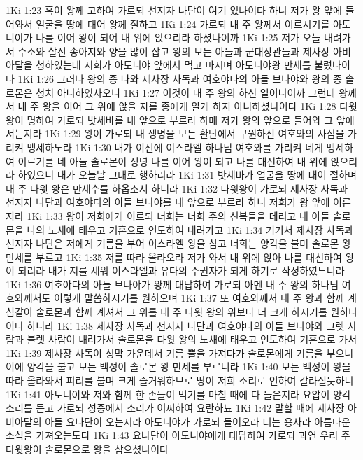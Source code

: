 1Ki 1:23  혹이 왕께 고하여 가로되 선지자 나단이 여기 있나이다 하니 저가 왕 앞에 들어와서 얼굴을 땅에 대어 왕께 절하고
1Ki 1:24  가로되 내 주 왕께서 이르시기를 아도니야가 나를 이어 왕이 되어 내 위에 앉으리라 하셨나이까
1Ki 1:25  저가 오늘 내려가서 수소와 살진 송아지와 양을 많이 잡고 왕의 모든 아들과 군대장관들과 제사장 아비아달을 청하였는데 저희가 아도니야 앞에서 먹고 마시며 아도니야왕 만세를 불렀나이다
1Ki 1:26  그러나 왕의 종 나와 제사장 사독과 여호야다의 아들 브나야와 왕의 종 솔로몬은 청치 아니하였사오니
1Ki 1:27  이것이 내 주 왕의 하신 일이니이까 그런데 왕께서 내 주 왕을 이어 그 위에 앉을 자를 종에게 알게 하지 아니하셨나이다
1Ki 1:28  다윗 왕이 명하여 가로되 밧세바를 내 앞으로 부르라 하매 저가 왕의 앞으로 들어와 그 앞에 서는지라
1Ki 1:29  왕이 가로되 내 생명을 모든 환난에서 구원하신 여호와의 사심을 가리켜 맹세하노라
1Ki 1:30  내가 이전에 이스라엘 하나님 여호와를 가리켜 네게 맹세하여 이르기를 네 아들 솔로몬이 정녕 나를 이어 왕이 되고 나를 대신하여 내 위에 앉으리라 하였으니 내가 오늘날 그대로 행하리라
1Ki 1:31  밧세바가 얼굴을 땅에 대어 절하며 내 주 다윗 왕은 만세수를 하옵소서 하니라
1Ki 1:32  다윗왕이 가로되 제사장 사독과 선지자 나단과 여호야다의 아들 브나야를 내 앞으로 부르라 하니 저희가 왕 앞에 이른지라
1Ki 1:33  왕이 저희에게 이르되 너희는 너희 주의 신복들을 데리고 내 아들 솔로몬을 나의 노새에 태우고 기혼으로 인도하여 내려가고
1Ki 1:34  거기서 제사장 사독과 선지자 나단은 저에게 기름을 부어 이스라엘 왕을 삼고 너희는 양각을 불며 솔로몬 왕 만세를 부르고
1Ki 1:35  저를 따라 올라오라 저가 와서 내 위에 앉아 나를 대신하여 왕이 되리라 내가 저를 세워 이스라엘과 유다의 주권자가 되게 하기로 작정하였느니라
1Ki 1:36  여호야다의 아들 브나야가 왕께 대답하여 가로되 아멘 내 주 왕의 하나님 여호와께서도 이렇게 말씀하시기를 원하오며
1Ki 1:37  또 여호와께서 내 주 왕과 함께 계심같이 솔로몬과 함께 계셔서 그 위를 내 주 다윗 왕의 위보다 더 크게 하시기를 원하나이다 하니라
1Ki 1:38  제사장 사독과 선지자 나단과 여호야다의 아들 브나야와 그렛 사람과 블렛 사람이 내려가서 솔로몬을 다윗 왕의 노새에 태우고 인도하여 기혼으로 가서
1Ki 1:39  제사장 사독이 성막 가운데서 기름 뿔을 가져다가 솔로몬에게 기름을 부으니 이에 양각을 불고 모든 백성이 솔로몬 왕 만세를 부르니라
1Ki 1:40  모든 백성이 왕을 따라 올라와서 피리를 불며 크게 즐거워하므로 땅이 저희 소리로 인하여 갈라질듯하니
1Ki 1:41  아도니야와 저와 함께 한 손들이 먹기를 마칠 때에 다 들은지라 요압이 양각 소리를 듣고 가로되 성중에서 소리가 어찌하여 요란하뇨
1Ki 1:42  말할 때에 제사장 아비아달의 아들 요나단이 오는지라 아도니야가 가로되 들어오라 너는 용사라 아름다운 소식을 가져오는도다
1Ki 1:43  요나단이 아도니야에게 대답하여 가로되 과연 우리 주 다윗왕이 솔로몬으로 왕을 삼으셨나이다

